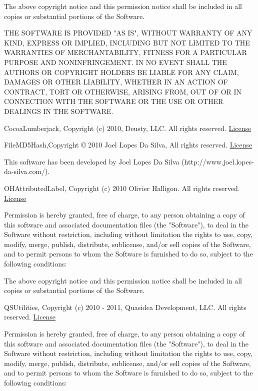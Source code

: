 \documentclass{tufte-book}
\newcommand{\licensetext}{\scriptsize \setlength{\parskip}{0mm} \singlespacing}
\begin{document}
\begin{fullwidth}
{The above copyright notice and this permission notice shall be included in all copies or substantial portions of the Software.

THE SOFTWARE IS PROVIDED "AS IS", WITHOUT WARRANTY OF ANY KIND, EXPRESS OR IMPLIED, INCLUDING BUT NOT LIMITED TO THE WARRANTIES OF MERCHANTABILITY, FITNESS FOR A PARTICULAR PURPOSE AND NONINFRINGEMENT. IN NO EVENT SHALL THE AUTHORS OR COPYRIGHT HOLDERS BE LIABLE FOR ANY CLAIM, DAMAGES OR OTHER LIABILITY, WHETHER IN AN ACTION OF CONTRACT, TORT OR OTHERWISE, ARISING FROM, OUT OF OR IN CONNECTION WITH THE SOFTWARE OR THE USE OR OTHER DEALINGS IN THE SOFTWARE.}

CocoaLumberjack, Copyright (c) 2010, Deusty, LLC. All rights reserved. \href{https://github.com/robbiehanson/CocoaLumberjack/blob/master/LICENSE.txt}{License}

FileMD5Hash,Copyright © 2010 Joel Lopes Da Silva, All rights reserved. \href{https://github.com/JoeKun/FileMD5Hash/blob/master/LICENSE}{License}

{\licensetext This software has been developed by Joel Lopes Da Silva (http://www.joel.lopes-da-silva.com/).
}


OHAttributedLabel, Copyright (c) 2010 Olivier Halligon. All rights reserved. \href{https://github.com/AliSoftware/OHAttributedLabel/blob/master/LICENSE}{License}

{\licensetext
Permission is hereby granted, free of charge, to any person obtaining a copy
of this software and associated documentation files (the "Software"), to deal
in the Software without restriction, including without limitation the rights
to use, copy, modify, merge, publish, distribute, sublicense, and/or sell
copies of the Software, and to permit persons to whom the Software is
furnished to do so, subject to the following conditions:

The above copyright notice and this permission notice shall be included in
all copies or substantial portions of the Software.}

QSUtilities, Copyright (c) 2010 - 2011, Quasidea Development, LLC. All rights reserved. \href{https://github.com/mikeho/QSUtilities/blob/master/LICENSE.txt}{License}

{\licensetext Permission is hereby granted, free of charge, to any person obtaining a copy
of this software and associated documentation files (the "Software"), to deal
in the Software without restriction, including without limitation the rights
to use, copy, modify, merge, publish, distribute, sublicense, and/or sell
copies of the Software, and to permit persons to whom the Software is
furnished to do so, subject to the following conditions:

}
\end{fullwidth}
\end{document}
